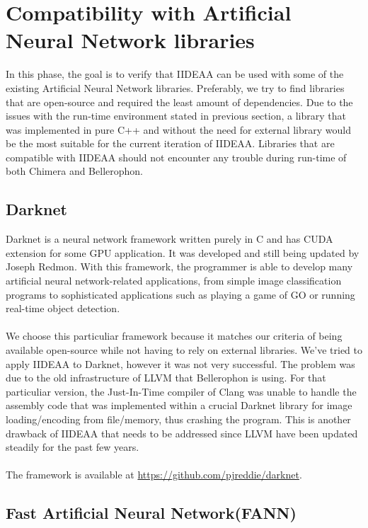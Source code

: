 \section{Compatibility with Artificial Neural Network libraries}

In this phase, the goal is to verify that IIDEAA can be used with some of the existing Artificial Neural Network libraries. Preferably, we try to find libraries that are open-source and required the least amount of dependencies. Due to the issues with the run-time environment stated in previous section, a library that was implemented in pure C++ and without the need for external library would be the most suitable for the current iteration of IIDEAA. Libraries that are compatible with IIDEAA should not encounter any trouble during run-time of both Chimera and Bellerophon.\\

\subsection{Darknet}
Darknet\cite{darknet13} is a neural network framework written purely in C and has CUDA extension for some GPU application. It was developed and still being updated by Joseph Redmon. With this framework, the programmer is able to develop many artificial neural network-related applications, from simple image classification programs to sophisticated applications such as playing a game of GO or running real-time object detection.\\
~\\
We choose this particuliar framework because it matches our criteria of being available open-source while not having to rely on external libraries. We've tried to apply IIDEAA to Darknet, however it was not very successful. The problem was due to the old infrastructure of LLVM that Bellerophon is using. For that particuliar version, the Just-In-Time compiler of Clang was unable to handle the assembly code that was implemented within a crucial Darknet library for image loading/encoding from file/memory, thus crashing the program. This is another drawback of IIDEAA that needs to be addressed since LLVM have been updated steadily for the past few years. \\
~\\
The framework is available at \url{https://github.com/pjreddie/darknet}.\\
\subsection{Fast Artificial Neural Network(FANN)}

